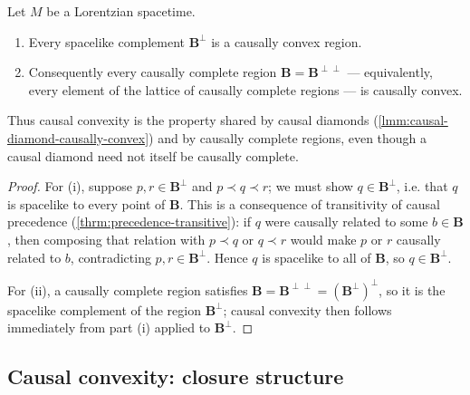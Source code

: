\medskip

\begin{theorem}
    \label{thrm:causally-complete-convex}
    \leanok
    Let $M$ be a Lorentzian spacetime.
    \begin{enumerate}
        \item Every spacelike complement $\mathbf{B}^\perp$ is a causally convex region.
        \item Consequently every causally complete region $\mathbf{B} = \mathbf{B}^{\perp\perp}$ — equivalently, every element of the lattice of causally complete regions — is causally convex.
    \end{enumerate}
    Thus causal convexity is the property shared by causal diamonds (\ref{lmm:causal-diamond-causally-convex}) and by causally complete regions, even though a causal diamond need not itself be causally complete.
\end{theorem}
\begin{proof}
    \leanok
    For (i), suppose $p, r \in \mathbf{B}^\perp$ and $p \prec q \prec r$; we must show $q \in \mathbf{B}^\perp$, i.e. that $q$ is spacelike to every point of $\mathbf{B}$. This is a consequence of transitivity of causal precedence (\ref{thrm:precedence-transitive}): if $q$ were causally related to some $b \in \mathbf{B}$, then composing that relation with $p \prec q$ or $q \prec r$ would make $p$ or $r$ causally related to $b$, contradicting $p, r \in \mathbf{B}^\perp$. Hence $q$ is spacelike to all of $\mathbf{B}$, so $q \in \mathbf{B}^\perp$.

    For (ii), a causally complete region satisfies $\mathbf{B} = \mathbf{B}^{\perp\perp} = (\mathbf{B}^\perp)^\perp$, so it is the spacelike complement of the region $\mathbf{B}^\perp$; causal convexity then follows immediately from part (i) applied to $\mathbf{B}^\perp$.
\end{proof}

\medskip

\subsection{Causal convexity: closure structure}

